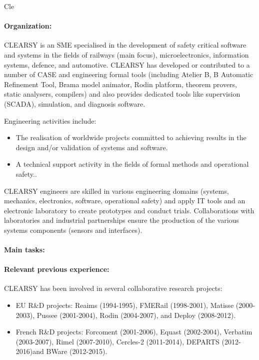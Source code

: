 \begin{sitedescription}{Cle}

\paragraph{Organization:}

CLEARSY is an SME specialised in the development of safety critical software and systems in the fields
of railways (main focus), microelectronics, information systems, defence, and automotive. CLEARSY
has developed or contributed to a number of CASE and engineering formal tools (including Atelier
B, B Automatic Refinement Tool, Brama model animator, Rodin platform, theorem provers, static
analysers, compilers) and also provides dedicated tools like supervision (SCADA), simulation, and
diagnosis software.

Engineering activities include:
\begin{itemize}
\item The realisation of worldwide projects committed to achieving results in the design and/or validation of systems and software.
\item A technical support activity in the fields of formal methods and operational safety..
\end{itemize}

CLEARSY engineers are skilled in various engineering domains (systems, mechanics, electronics, software,
operational safety) and apply IT tools and an electronic laboratory to create prototypes and
conduct trials. Collaborations with laboratories and industrial partnerships ensure the production of
the various systems components (sensors and interfaces).

\paragraph{Main tasks:}

\begin{compactitem}
\item{} 
\end{compactitem}

\paragraph{Relevant previous experience:}

CLEARSY has been involved in several collaborative research projects:
\begin{itemize}
\item EU R\&D projects: Reaims (1994-1995), FMERail (1998-2001), Matisse (2000-2003), Pussee (2001-2004), Rodin (2004-2007), and Deploy (2008-2012).
\item French R\&D projects: Forcoment (2001-2006), Equast (2002-2004), Verbatim (2003-2007), Rimel (2007-2010), Cercles-2 (2011-2014), DEPARTS (2012-2016)and BWare (2012-2015).
\end{itemize}


\end{sitedescription}
